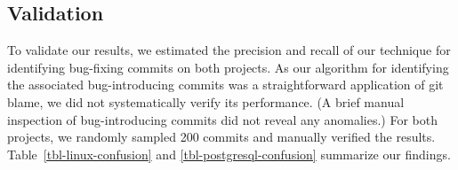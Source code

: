 


\subsection{Validation} 
\label{sec-validation}







To validate our results, we estimated the precision and recall of our technique
for identifying bug-fixing commits on both projects.  As our algorithm for
identifying the associated bug-introducing commits was a straightforward
application of git blame, we did not systematically verify its performance. (A
brief manual inspection of bug-introducing commits did not reveal any
anomalies.)  For both projects, we randomly sampled 200 commits and manually
verified the results. Table~\ref{tbl-linux-confusion} and
\ref{tbl-postgresql-confusion} summarize our findings.

